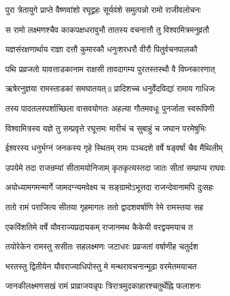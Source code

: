 
\vakta{}
\shrota{}
\tags{}
\notes{}

\storymeta





\twolineshloka
{पुरा त्रेतायुगे प्राप्ते वैष्णवांशो रघूद्वहः}
{सूर्यवंशे समुत्पन्नो रामो राजीवलोचनः}%

\twolineshloka
{स रामो लक्ष्मणश्चैव काकपक्षधरावुभौ}
{तातस्य वचनात्तौ तु विश्वामित्रमनुव्रतौ}%

\twolineshloka
{यज्ञसंरक्षणार्थाय राज्ञा दत्तौ कुमारकौ}
{धनुःशरधरौ वीरौ पितुर्वचनपालकौ}%

\twolineshloka
{पथि प्रव्रजतो यावत्ताडकानाम राक्षसी}
{तावदागम्य पुरतस्तस्थौ वै विघ्नकारणात्}%


\twolineshloka
{ऋषेरनुज्ञया रामस्ताडकां समघातयत्॥}
{प्रादिशच्च धनुर्वेदविद्यां रामाय गाधिजः}%

\twolineshloka
{तस्य पादतलस्पर्शाच्छिला वासवयोगतः}
{अहल्या गौतमवधूः पुनर्जाता स्वरूपिणी}%


\twolineshloka
{विश्वामित्रस्य यज्ञे तु सम्प्रवृत्ते रघूत्तमः}
{मारीचं च सुबाहुं च जघान परमेषुभिः}%

\twolineshloka
{ईश्वरस्य धनुर्भग्नं जनकस्य गृहे स्थितम्}
{रामः पञ्चदशे वर्षे षड्वर्षां चैव मैथिलीम्}%

\twolineshloka
{उपयेमे तदा राजन्रम्यां सीतामयोनिजाम्}
{कृतकृत्यस्तदा जातः सीतां सम्प्राप्य राघवः}%

\twolineshloka
{अयोध्यामगमन्मार्गे जामदग्न्यमवेक्ष्य च}
{सङ्ग्रामोऽभूत्तदा राजन्देवानामपि दुःसहः}%

\twolineshloka
{ततो रामं पराजित्य सीतया गृहमागतः}
{ततो द्वादशवर्षाणि रेमे रामस्तया सह}%

\twolineshloka
{एकविंशतिमे वर्षे यौवराज्यप्रदायकम्}
{राजानमथ कैकेयी वरद्वयमयाच त}%

\twolineshloka
{तयोरेकेन रामस्तु ससीतः सहलक्ष्मणः}
{जटाधरः प्रव्रजतां वर्षाणीह चतुर्दश}%

\twolineshloka
{भरतस्तु द्वितीयेन यौवराज्याधिपोस्तु मे}
{मन्थरावचनान्मूढा वरमेतमयाचत}%

\twolineshloka
{जानकीलक्ष्मणसखं रामं प्राव्राजयन्नृपः}
{त्रिरात्रमुदकाहारश्चतुर्थेह्नि फलाशनः}%

